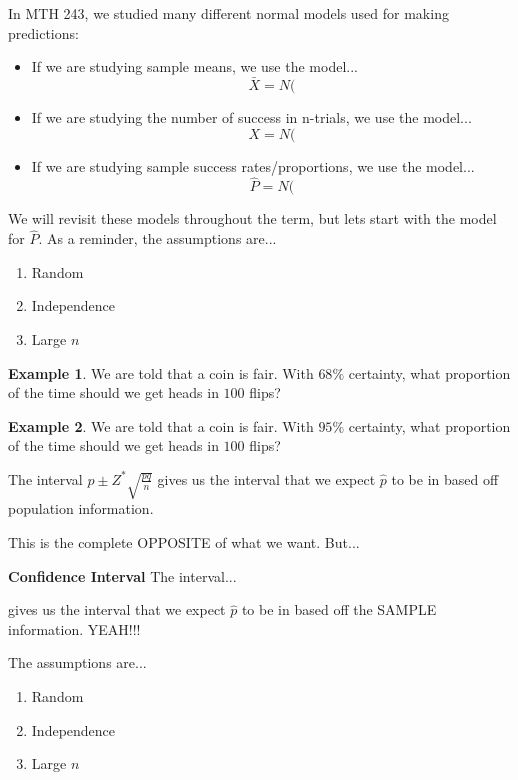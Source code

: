 \documentclass[12pt]{amsart}
\theoremstyle{definition}
\newtheorem{ex}{Example}
\begin{document}
 \newpage
 \noindent In MTH 243, we studied many different normal models used for making predictions:
 \begin{framed}
 	
 	\begin{itemize}
 		\item If we are studying sample means, we use the model... $$\bar{X}=N($$
 		\item If we are studying the number of success in n-trials, we use the model...$$X=N($$
 		\item If we are studying sample success rates/proportions, we use the model...$$\hat{P}=N($$
 	\end{itemize}
 	\end{framed}
 We will revisit these models throughout the term, but lets start with the model for $\hat{P}$. As a reminder, the assumptions are...
 \begin{enumerate}
 	\item Random
 	\item Independence
 	\item Large $n$
 \end{enumerate}

 \begin{ex} We are told that a coin is fair. With $68\%$ certainty, what proportion of the time should we get heads in $100$ flips?
 	\end{ex}\vfill
  \begin{ex} We are told that a coin is fair. With $95\%$ certainty, what proportion of the time should we get heads in $100$ flips?
  \end{ex}\vfill
 \newpage
 \begin{framed} The interval $p\pm Z^*\sqrt{\frac{pq}{n}}$ gives us the interval that we expect $\hat{p}$ to be in based off population information.
 	\end{framed}
 
 This is the complete OPPOSITE of what we want. But...
 
 \begin{framed} \textbf{Confidence Interval} The interval...\vspace{0.25in}
 	
 	gives us the interval that we expect $\hat{p}$ to be in based off the SAMPLE information. YEAH!!!
 	
 \end{framed}
 The assumptions are...
 \begin{enumerate}
 	\item Random
 	\item Independence
 	\item Large $n$
 \end{enumerate}
 
\end{document}
